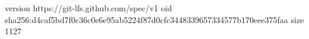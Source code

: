 version https://git-lfs.github.com/spec/v1
oid sha256:d4caf5bd7f0c36c0e6e95ab5224f87d0cfc3448339657334577b170eee375faa
size 1127
